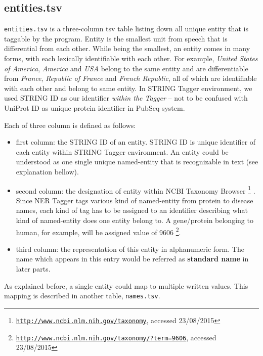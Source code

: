 \subsection{entities.tsv}

\texttt{entities.tsv} is a three-column tsv table listing down all unique entity that is taggable by the program. Entity is the smallest unit from speech that is differential from each other. While being the smallest, an entity comes in many forms, with each lexically identifiable with each other. For example, \textit{United States of America}, \textit{America} and \textit{USA} belong to the same entity and are differentiable from \textit{France}, \textit{Republic of France} and \textit{French Republic}, all of which are identifiable with each other and belong to same entity. In STRING Tagger environment, we used STRING ID \citep{szklarczyk2011string} as our identifier \textit{within the Tagger} -- not to be confused with UniProt ID as unique protein identifier in PubSeq system.


Each of three column is defined as follows:


\begin{itemize}
\item first column: the STRING ID of an entity. STRING ID is unique identifier of each entity within STRING Tagger environment. An entity could be understood as one single unique named-entity that is recognizable in text (see explanation bellow).
\item second column: the designation of entity within NCBI Taxonomy Browser \footnote{\href{http://www.ncbi.nlm.nih.gov/taxonomy}{\texttt{http://www.ncbi.nlm.nih.gov/taxonomy}}, accessed 23/08/2015} \citep{federhen2012ncbi}. Since NER Tagger tags various kind of named-entity from protein to disease names, each kind of tag has to be assigned to an identifier describing what kind of named-entity does one entity belong to. A gene/protein belonging to human, for example, will be assigned value of 9606 \footnote{\href{http://www.ncbi.nlm.nih.gov/taxonomy/?term=9606}{\texttt{http://www.ncbi.nlm.nih.gov/taxonomy/?term=9606}}, accessed 23/08/2015}.
\item third column: the representation of this entity in alphanumeric form. The name which appears in this entry would be referred as \textbf{standard name} in later parts.
\end{itemize}

As explained before, a single entity could map to multiple written values. This mapping is described in another table, \texttt{names.tsv}.

